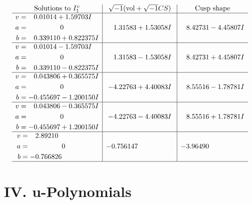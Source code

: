 \documentclass[1p]{elsarticle_modified}
\theoremstyle{definition}
\newcommand{\I}{\sqrt{-1}}
\begin{document}
$$\begin{array}{c|c|c}  
\text{Solutions to }I^v_{1}& \I (\text{vol} + \sqrt{-1}CS) & \text{Cusp shape}\\
 \hline 
\begin{aligned}
v &= \phantom{-}0.01014 + 1.59703 I \\
a &= \phantom{-0.000000 } 0 \\
b &= \phantom{-}0.339110 + 0.822375 I\end{aligned}
 & \phantom{-}1.31583 + 1.53058 I & \phantom{-}8.42731 - 4.45807 I \\ \hline\begin{aligned}
v &= \phantom{-}0.01014 - 1.59703 I \\
a &= \phantom{-0.000000 } 0 \\
b &= \phantom{-}0.339110 - 0.822375 I\end{aligned}
 & \phantom{-}1.31583 - 1.53058 I & \phantom{-}8.42731 + 4.45807 I \\ \hline\begin{aligned}
v &= \phantom{-}0.043806 + 0.365575 I \\
a &= \phantom{-0.000000 } 0 \\
b &= -0.455697 - 1.200150 I\end{aligned}
 & -4.22763 + 4.40083 I & \phantom{-}8.55516 - 1.78781 I \\ \hline\begin{aligned}
v &= \phantom{-}0.043806 - 0.365575 I \\
a &= \phantom{-0.000000 } 0 \\
b &= -0.455697 + 1.200150 I\end{aligned}
 & -4.22763 - 4.40083 I & \phantom{-}8.55516 + 1.78781 I \\ \hline\begin{aligned}
v &= \phantom{-}2.89210\phantom{ +0.000000I} \\
a &= \phantom{-0.000000 } 0 \\
b &= -0.766826\phantom{ +0.000000I}\end{aligned}
 & -0.756147\phantom{ +0.000000I} & -3.96490\phantom{ +0.000000I}\\
 \hline 
 \end{array}$$\newpage
\newpage\renewcommand{\arraystretch}{1}
\centering \section*{ IV. u-Polynomials}
\end{document}
